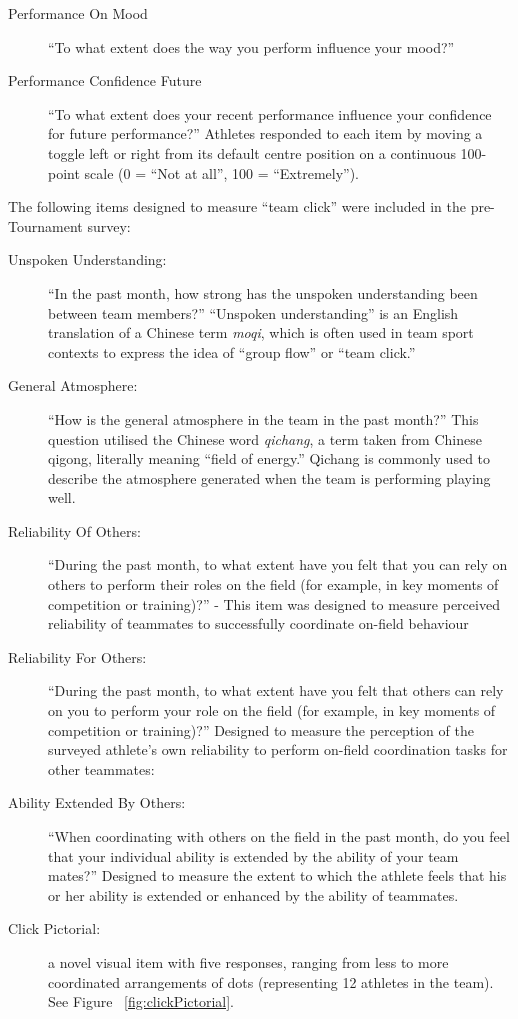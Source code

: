     \begin{description}
    \item[Performance On Mood] ``To what extent does the way you perform influence your mood?''
    \item [Performance Confidence Future] ``To what extent does your recent performance influence your confidence for future performance?''
    Athletes responded to each item by moving a toggle left or right from its default centre position on a continuous 100-point scale (0 = ``Not at all'', 100 = ``Extremely'').
    \end{description}



The following items designed to measure ``team click'' were included in the pre-Tournament survey:
\begin{description}
  \item [Unspoken Understanding:] ``In the past month, how strong has the unspoken understanding been between team members?''  ``Unspoken understanding'' is an English translation of a Chinese term \textit{moqi}, which is often used in team sport contexts to express the idea of  ``group flow'' or ``team click.''
  \item [General Atmosphere:] ``How is the general atmosphere in the team in the past month?'' This question utilised the Chinese word \textit{qichang}, a term taken from Chinese qigong, literally meaning ``field of energy.'' Qichang is commonly used to describe the atmosphere generated when the team is performing playing well.
  \item [Reliability Of Others:] ``During the past month, to what extent have you felt that you can rely on others to perform their roles on the field (for example, in key moments of competition or training)?'' - This item was designed to measure perceived reliability of teammates to successfully coordinate  on-field behaviour
  \item [Reliability For Others:] ``During the past month, to what extent have you felt that others can rely on you to perform your role on the field (for example, in key moments of competition or training)?'' Designed to measure the perception of the surveyed athlete's own reliability to perform on-field coordination tasks for other teammates:
  \item[Ability Extended By Others:] ``When coordinating with others on the field in the past month, do you feel that your individual ability is extended by the ability of your team mates?'' Designed to measure the extent to which the athlete feels that his or her ability is extended or enhanced by the ability of teammates.
  \item [Click Pictorial:] a novel visual item with five responses, ranging from less to more coordinated arrangements of dots (representing 12 athletes in the team). See Figure ~\ref{fig:clickPictorial}.
\end{description}

